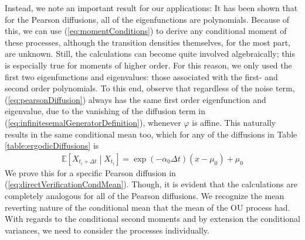 Instead, we note an important result for our applications: It has been shown \cite{FormanSorensen2008} that for the Pearson diffusions, all of the eigenfunctions are polynomials. Because of this, we can use (\ref{eq:momentConditions}) to derive any conditional moment of these processes, although the transition densities themselves, for the most part, are unknown. Still, the calculations can become quite involved algebraically; this is especially true for moments of higher order. For this reason, we only used the first two eigenfunctions and eigenvalues: those associated with the first- and second order polynomials. To this end, observe that regardless of the noise term, (\ref{eq:pearsonDiffusion}) always has the same first order eigenfunction and eigenvalue, due to the vanishing of the diffusion term in (\ref{eq:infinitesemalGeneratorDefinition}), whenever $\varphi$ is affine. This naturally results in the same conditional mean too, which for any of the diffusions in Table \ref{table:ergodicDiffusions} is
\begin{align}
    \mathbb{E}\left[X_{t_{i}+\Delta t} \middle|X_{t_{i}} \right] = \exp\left(-\alpha_0\Delta t\right)\left(x-\mu_0\right) + \mu_0
\end{align}
We prove this for a specific Pearson diffusion in (\ref{eq:directVerificationCondMean}). Though, it is evident that the calculations are completely analogous for all of the Pearson diffusions. We recognize the mean reverting nature of the conditional mean that the mean of the OU process had. With regards to the conditional second moments and by extension the conditional variances, we need to consider the processes individually.
